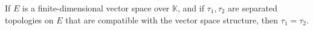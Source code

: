 If $E$ is a finite-dimensional vector space over $\mathbb{K}$, and if $\tau_1, \tau_2$ are separated topologies on $E$ that are compatible with the vector space structure, then $\tau_1 = \tau_2$.